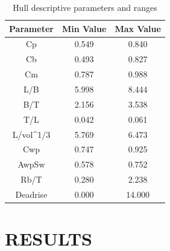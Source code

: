 \documentclass[10pt,a4paper,twocolumn]{article}
\begin{document}
\begin{table}[]
\centering
\caption{Hull descriptive parameters and ranges}
\label{tab:hull_parameters}
\begin{tabular}{@{}ccc@{}}
\toprule
\textbf{Parameter} & \textbf{Min Value} & \textbf{Max Value} \\ \midrule
Cp & 0.549 & 0.840 \\
Cb & 0.493 & 0.827 \\
Cm & 0.787 & 0.988 \\
L/B & 5.998 & 8.444 \\
B/T & 2.156 & 3.538 \\
T/L & 0.042 & 0.061 \\
L/vol\textasciicircum{}1/3 & 5.769 & 6.473 \\
Cwp & 0.747 & 0.925 \\
AwpSw & 0.578 & 0.752 \\
Rb/T & 0.280 & 2.238 \\
Deadrise & 0.000 & 14.000 \\ \bottomrule
\end{tabular}
\end{table}

\begin{table}[]
\centering
\caption{Network hyperparameters used to build the feed forward neural network}
\label{tab:network_parameters}
\end{table}


\section{RESULTS}
\end{document}

